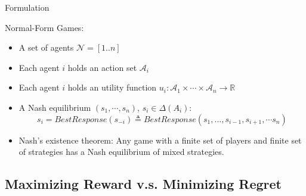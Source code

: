 \documentclass{beamer}
\begin{document}
\begin{frame}{Formulation}
    \begin{exampleblock}{Normal-Form Games:}
        \begin{itemize}
            \item A set of agents $\mathcal{N} = [1..n]$

            \item Each agent $i$ holds an action set $\mathcal{A}_i$

            \item Each agent $i$ holds an utility function
            $u_i: \mathcal{A}_1 \times \cdots \times \mathcal{A}_n \rightarrow \mathbb{R}$
            
            \item \alert{A Nash equilibrium $(s_1, \cdots, s_n)$,
            $s_i \in \Delta(A_i)$:
            \[
            s_i 
            = BestResponse(s_{-i})
            \triangleq BestResponse(s_1, ...,s_{i-1}, s_{i+1}, \cdots s_n) 
            \]}
            \item Nash's existence theorem:
            Any game with a finite set of players and finite set of strategies has a Nash equilibrium of mixed strategies.
        \end{itemize}
        
    \end{exampleblock}
\end{frame}


\subsection{Maximizing Reward v.s. Minimizing Regret}
\end{document}

